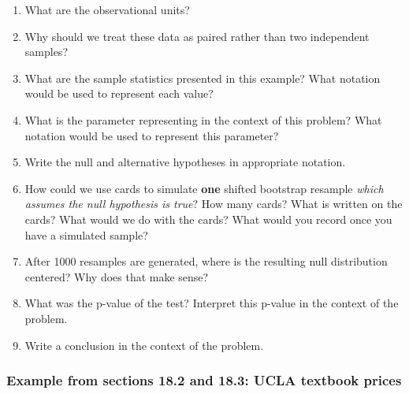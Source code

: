 \documentclass[
]{report}
\newcommand{\rgs}{\vspace{12pt}} %
\begin{document}
\begin{enumerate}
\def\labelenumi{\arabic{enumi}.}
\item
  What are the observational units?
  \rgs
\item
  Why should we treat these data as paired rather than two independent samples?
  \rgs
\item
  What are the sample statistics presented in this example? What notation would be used to represent each value?
  \rgs
\item
  What is the parameter representing in the context of this problem? What notation would be used to represent this parameter?
  \rgs
  \rgs
\item
  Write the null and alternative hypotheses in appropriate notation.
  \rgs
\item
  How could we use cards to simulate \textbf{one} shifted bootstrap resample \emph{which assumes the null hypothesis is true}? How many cards? What is written on the cards? What would we do with the cards? What would you record once you have a simulated sample?
  \rgs
  \rgs
  \rgs
\item
  After 1000 resamples are generated, where is the resulting null distribution centered? Why does that make sense?
  \rgs
\item
  What was the p-value of the test? Interpret this p-value in the context of the problem.
  \rgs
  \rgs
\item
  Write a conclusion in the context of the problem.
  \rgs
\end{enumerate}

\hypertarget{example-from-sections-18.2-and-18.3-ucla-textbook-prices}{%
\subsubsection*{Example from sections 18.2 and 18.3: UCLA textbook prices}\label{example-from-sections-18.2-and-18.3-ucla-textbook-prices}}
\end{document}
